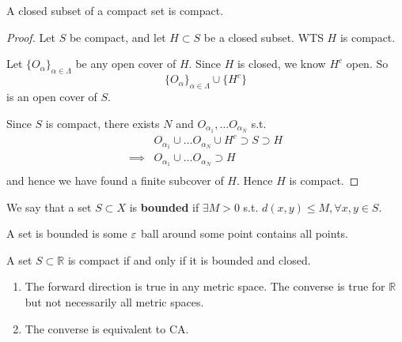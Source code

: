 \begin{proposition}
    A closed subset of a compact set is compact. 
\end{proposition}
\begin{proof}
    Let $S$ be compact, and let $H \subset S$ be a closed subset. 
    WTS $H$ is compact. 
    \medskip 

    Let $\{ O_{\alpha} \}_{\alpha \in \Lambda} $ be any open cover of $H$. 
    Since $H$ is closed, we know $H^c$ open. So 
    \[
    \{ O_{\alpha} \}_{\alpha \in \Lambda} \cup \{ H^c \} 
    \]
    is an open cover of $S$.
    \medskip 

    Since $S$ is compact, there exists $N$ and $O_{\alpha_1}, \hdots O_{\alpha_N}$
    s.t.
    \begin{align*}
        & O_{\alpha_1} \cup \hdots O_{\alpha_N} \cup H^c \supset S \supset H \\
        \implies & O_{\alpha_1} \cup \hdots O_{\alpha_N} \supset H \\
    \end{align*}
    and hence we have found a finite subcover of $H$. Hence $H$ is compact. 
\end{proof}

\begin{definition}
    We say that a set $S \subset X$ is \textbf{bounded} 
    if $\exists M > 0$ s.t. 
    $d(x,y) \leq M, \forall x, y \in S$.
\end{definition}

\begin{remark}
    A set is bounded is some $\varepsilon$ ball around some 
    point contains all points.
\end{remark}

\begin{theorem}
    A set $S \subset \mathbb{R}$ is compact if and only if it is bounded and closed.
\end{theorem}

\begin{remarks}
    \begin{enumerate}
        \item 
    The forward direction is true in any metric space. 
    The converse is true for $\mathbb{R}$ but not necessarily all
    metric spaces.
        \item The converse is equivalent to CA.
    \end{enumerate}
\end{remarks}

